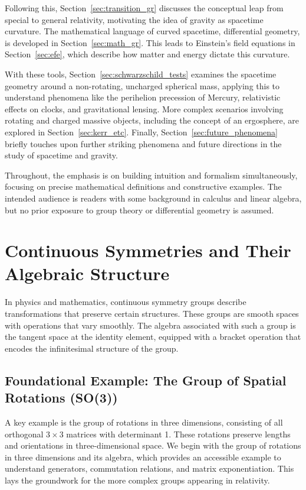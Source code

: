 \documentclass{amsart}
\theoremstyle{definition}
\theoremstyle{remark}
\begin{document}
Following this, Section~\ref{sec:transition_gr} discusses the conceptual leap from special to general relativity, motivating the idea of gravity as spacetime curvature. The mathematical language of curved spacetime, differential geometry, is developed in Section~\ref{sec:math_gr}. This leads to Einstein's field equations in Section~\ref{sec:efe}, which describe how matter and energy dictate this curvature.

With these tools, Section~\ref{sec:schwarzschild_tests} examines the spacetime geometry around a non-rotating, uncharged spherical mass, applying this to understand phenomena like the perihelion precession of Mercury, relativistic effects on clocks, and gravitational lensing. More complex scenarios involving rotating and charged massive objects, including the concept of an ergosphere, are explored in Section~\ref{sec:kerr_etc}. Finally, Section~\ref{sec:future_phenomena} briefly touches upon further striking phenomena and future directions in the study of spacetime and gravity.

Throughout, the emphasis is on building intuition and formalism simultaneously, focusing on precise mathematical definitions and constructive examples. The intended audience is readers with some background in calculus and linear algebra, but no prior exposure to group theory or differential geometry is assumed.

\section{Continuous Symmetries and Their Algebraic Structure}
\label{sec:cont_symm}

In physics and mathematics, continuous symmetry groups describe transformations that preserve certain structures. These groups are smooth spaces with operations that vary smoothly. The algebra associated with such a group is the tangent space at the identity element, equipped with a bracket operation that encodes the infinitesimal structure of the group.

\subsection{Foundational Example: The Group of Spatial Rotations (SO(3))}
\label{subsec:so3}
A key example is the group of rotations in three dimensions, consisting of all orthogonal \(3 \times 3\) matrices with determinant 1. These rotations preserve lengths and orientations in three-dimensional space. We begin with the group of rotations in three dimensions and its algebra, which provides an accessible example to understand generators, commutation relations, and matrix exponentiation. This lays the groundwork for the more complex groups appearing in relativity.
\end{document}
